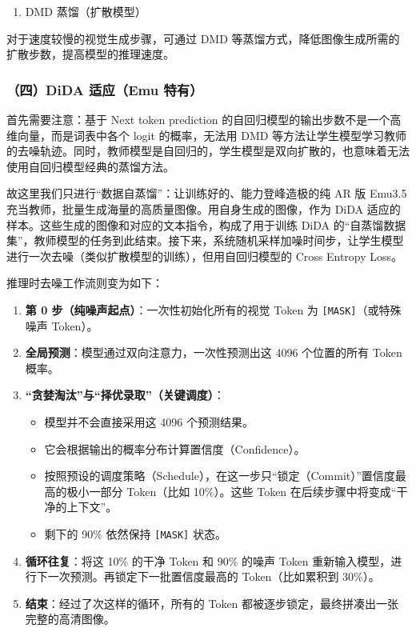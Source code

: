 \begin{enumerate}
\def\labelenumi{\arabic{enumi}.}
\setcounter{enumi}{2}
\tightlist
\item
  DMD 蒸馏（扩散模型）
\end{enumerate}

对于速度较慢的视觉生成步骤，可通过 DMD 等蒸馏方式，降低图像生成所需的扩散步数，提高模型的推理速度。

\hypertarget{ux56dbdida-ux9002ux5e94emu-ux7279ux6709}{%
\subsubsection{（四）DiDA 适应（Emu 特有）}\label{ux56dbdida-ux9002ux5e94emu-ux7279ux6709}}

首先需要注意：基于 Next token prediction 的自回归模型的输出步数不是一个高维向量，而是词表中各个 logit 的概率，无法用 DMD 等方法让学生模型学习教师的去噪轨迹。同时，教师模型是自回归的，学生模型是双向扩散的，也意味着无法使用自回归模型经典的蒸馏方法。

故这里我们只进行``数据自蒸馏''：让训练好的、能力登峰造极的纯 AR 版 Emu3.5 充当教师，批量生成海量的高质量图像。用自身生成的图像，作为 DiDA 适应的样本。这些生成的图像和对应的文本指令，构成了用于训练 DiDA 的``自蒸馏数据集''，教师模型的任务到此结束。接下来，系统随机采样加噪时间步，让学生模型进行一次去噪（类似扩散模型的训练），但用自回归模型的 Cross Entropy Loss。

推理时去噪工作流则变为如下：

\begin{enumerate}
\def\labelenumi{\arabic{enumi}.}
\tightlist
\item
  \textbf{第 0 步（纯噪声起点）}：一次性初始化所有的视觉 Token 为 \texttt{{[}MASK{]}}（或特殊噪声 Token）。
\item
  \textbf{全局预测}：模型通过双向注意力，一次性预测出这 4096 个位置的所有 Token 概率。
\item
  \textbf{``贪婪淘汰''与``择优录取''（关键调度）}：

  \begin{itemize}
  \tightlist
  \item
    模型并不会直接采用这 4096 个预测结果。
  \item
    它会根据输出的概率分布计算置信度（Confidence）。
  \item
    按照预设的调度策略（Schedule），在这一步只``锁定（Commit）''置信度最高的极小一部分 Token（比如 10\%）。这些 Token 在后续步骤中将变成``干净的上下文''。
  \item
    剩下的 90\% 依然保持 \texttt{{[}MASK{]}} 状态。
  \end{itemize}
\item
  \textbf{循环往复}：将这 10\% 的干净 Token 和 90\% 的噪声 Token 重新输入模型，进行下一次预测。再锁定下一批置信度最高的 Token（比如累积到 30\%）。
\item
  \textbf{结束}：经过了次这样的循环，所有的 Token 都被逐步锁定，最终拼凑出一张完整的高清图像。
\end{enumerate}

